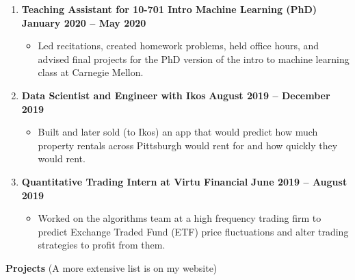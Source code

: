 \documentclass[letterpaper,11pt]{article}
\newlength{\outerbordwidth}
\newcommand{\resitem}[1]{\item #1 \vspace{-2pt}}
\newcommand{\resheading}[1]{\vspace{0pt} %
  \parbox{\textwidth}{\setlength{\FrameSep}{\outerbordwidth}
    \begin{shaded}
\setlength{\fboxsep}{0pt}\framebox[\textwidth][l]{\setlength{\fboxsep}{3.5pt}\fcolorbox{shadecolorB}{shadecolorB}{\textbf{\sffamily{\mbox{~}\makebox[7.262in][l]{\large #1} \vphantom{p\^{E}}}}}} %
    \end{shaded}
  }\vspace{-7pt} %
}
\begin{document}
\begin{enumerate}[leftmargin=10pt]
	\item[] \textbf{Teaching Assistant for \textcolor{myGreen}{10-701 Intro Machine Learning (PhD)}} \cftdotfill{\cftdotsep} \textbf{\textcolor{myGreen}{January 2020 --} May 2020}\\
	\vspace{-4pt}
	\begin{itemize}
		\resitem{Led recitations, created homework problems, held office hours, and advised final projects for the PhD version of the intro to machine learning class at Carnegie Mellon.}
	\end{itemize}

	\item[] \textbf{Data Scientist and Engineer with \textcolor{myGreen}{Ikos}} \cftdotfill{\cftdotsep} \textbf{\textcolor{myGreen}{August 2019 --} December 2019}\\
	\vspace{-4pt}	
	\begin{itemize}
		\resitem{Built and later sold (to Ikos) an app that would predict how much property rentals across Pittsburgh would rent for and how quickly they would rent.}	
	\end{itemize}
	
	\item[] \textbf{Quantitative Trading Intern at \textcolor{myGreen}{Virtu Financial}} \cftdotfill{\cftdotsep} \textbf{\textcolor{myGreen}{June 2019 --} August 2019}\\
	\vspace{-4pt}
	\begin{itemize}
		\resitem{Worked on the algorithms team at a high frequency trading firm to predict Exchange Traded Fund (ETF) price fluctuations and alter trading strategies to profit from them.}
	\end{itemize}
\end{enumerate}

\vspace{-10pt}

\begin{mybox}
	\hspace{-8pt} \textbf{Projects}  \fontsize{10.5}{15}\selectfont   (A more extensive list is on my website)
\end{mybox}

\end{document}

